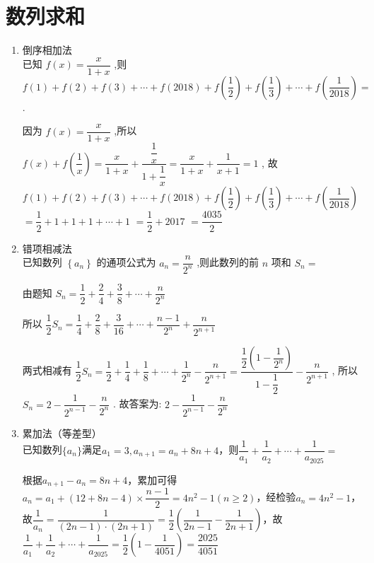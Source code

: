 \section*{数列求和}
\begin{enumerate}
    \item 倒序相加法 \\
    已知 $ f\left( x\right)  = \dfrac{x}{1 + x} $ ,则 $ f\left( 1\right)  + f\left( 2\right)  + f\left( 3\right)  + \cdots  + f\left( {2018}\right)  + f\left( \dfrac{1}{2}\right)  + f\left( \dfrac{1}{3}\right)  + \cdots  + f\left( \dfrac{1}{2018}\right)  = $ .
    \begin{jieda}
        因为 $ f\left( x\right)  = \dfrac{x}{1 + x} $ ,所以 $ f\left( x\right)  + f\left( \dfrac{1}{x}\right)  = \dfrac{x}{1 + x} + \dfrac{\dfrac{1}{x}}{1 + \dfrac{1}{x}} = \dfrac{x}{1 + x} + \dfrac{1}{x + 1} = 1 $ ,
        故 $ f\left( 1\right)  + f\left( 2\right)  + f\left( 3\right)  + \cdots  + f\left( {2018}\right)  + f\left( \dfrac{1}{2}\right)  + f\left( \dfrac{1}{3}\right)  + \cdots  + f\left( \dfrac{1}{2018}\right) $
        $ = \dfrac{1}{2} + 1 + 1 + 1 + \cdots  + 1 $
        $ = \dfrac{1}{2} + {2017} $
        $ = \dfrac{4035}{2} $
    \end{jieda}
    
    \item 错项相减法 \\
    已知数列 $ \left\{  {a}_{n}\right\} $ 的通项公式为 $ {a}_{n} = \dfrac{n}{{2}^{n}} $ ,则此数列的前 $ n $ 项和 $ {S}_{n} = $
    \begin{jieda}
        由题知 $ {S}_{n} = \dfrac{1}{2} + \dfrac{2}{4} + \dfrac{3}{8} + \cdots  + \dfrac{n}{{2}^{n}} $
        
        所以 $ \dfrac{1}{2}{S}_{n} = \dfrac{1}{4} + \dfrac{2}{8} + \dfrac{3}{16} + \cdots  + \dfrac{n - 1}{{2}^{n}} + \dfrac{n}{{2}^{n + 1}} $ 
        
        两式相减有 $ \dfrac{1}{2}{S}_{n} = \dfrac{1}{2} + \dfrac{1}{4} + \dfrac{1}{8} + \cdots  + \dfrac{1}{{2}^{n}} - \dfrac{n}{{2}^{n + 1}} = \dfrac{\dfrac{1}{2}\left( {1 - \dfrac{1}{{2}^{n}}}\right) }{1 - \dfrac{1}{2}} - \dfrac{n}{{2}^{n + 1}} $ ,
        所以 $ {S}_{n} = 2 - \dfrac{1}{{2}^{n - 1}} - \dfrac{n}{{2}^{n}} $ .
        故答案为: $ 2 - \dfrac{1}{{2}^{n - 1}} - \dfrac{n}{{2}^{n}} $
    \end{jieda}
    
    \item 累加法（等差型） \\
    已知数列$\{a_n\}$满足$a_1 = 3, a_{n+1} = a_n + 8n+4$，则$\dfrac{1}{a_1} + \dfrac{1}{a_2} + \cdots +\dfrac{1}{a_{2025}} = $
    \begin{jieda}
        根据$a_{n+1} - a_n = 8n+4$，累加可得$a_n = a_1 + (12 + 8n-4) \times \dfrac{n-1}{2} = 4n^2-1 (n\geq2)$，经检验$a_n = 4n^2 - 1$，故$\dfrac{1}{a_n} = \dfrac{1}{(2n-1)\cdot(2n+1)} = \dfrac{1}{2}\left(\dfrac{1}{2n-1} - \dfrac{1}{2n+1}\right)$，故$\dfrac{1}{a_1} + \dfrac{1}{a_2} + \cdots +\dfrac{1}{a_{2025}} = \dfrac{1}{2}\left(1 - \dfrac{1}{4051}\right) = \dfrac{2025}{4051}$
    \end{jieda}


\end{enumerate}
